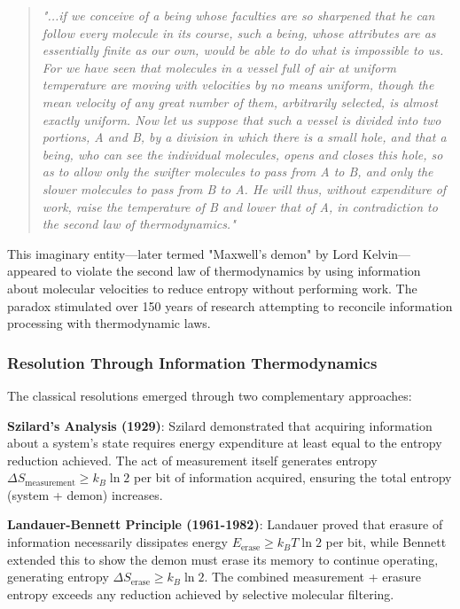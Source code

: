 \documentclass[11pt,a4paper]{article}
\begin{document}
\begin{quote}
\textit{"...if we conceive of a being whose faculties are so sharpened that he can follow every molecule in its course, such a being, whose attributes are as essentially finite as our own, would be able to do what is impossible to us. For we have seen that molecules in a vessel full of air at uniform temperature are moving with velocities by no means uniform, though the mean velocity of any great number of them, arbitrarily selected, is almost exactly uniform. Now let us suppose that such a vessel is divided into two portions, A and B, by a division in which there is a small hole, and that a being, who can see the individual molecules, opens and closes this hole, so as to allow only the swifter molecules to pass from A to B, and only the slower molecules to pass from B to A. He will thus, without expenditure of work, raise the temperature of B and lower that of A, in contradiction to the second law of thermodynamics."}
\end{quote}

This imaginary entity—later termed "Maxwell's demon" by Lord Kelvin—appeared to violate the second law of thermodynamics by using information about molecular velocities to reduce entropy without performing work\cite{leff2003maxwell}. The paradox stimulated over 150 years of research attempting to reconcile information processing with thermodynamic laws.

\subsubsection{Resolution Through Information Thermodynamics}

The classical resolutions emerged through two complementary approaches:

\textbf{Szilard's Analysis (1929)}: Szilard demonstrated that acquiring information about a system's state requires energy expenditure at least equal to the entropy reduction achieved\cite{szilard1929entropy}. The act of measurement itself generates entropy $\Delta S_{\text{measurement}} \geq k_B \ln 2$ per bit of information acquired, ensuring the total entropy (system + demon) increases.

\textbf{Landauer-Bennett Principle (1961-1982)}: Landauer proved that erasure of information necessarily dissipates energy $E_{\text{erase}} \geq k_B T \ln 2$ per bit\cite{landauer1961irreversibility}, while Bennett extended this to show the demon must erase its memory to continue operating, generating entropy $\Delta S_{\text{erase}} \geq k_B \ln 2$\cite{bennett1982thermodynamics}. The combined measurement + erasure entropy exceeds any reduction achieved by selective molecular filtering.
\end{document}
